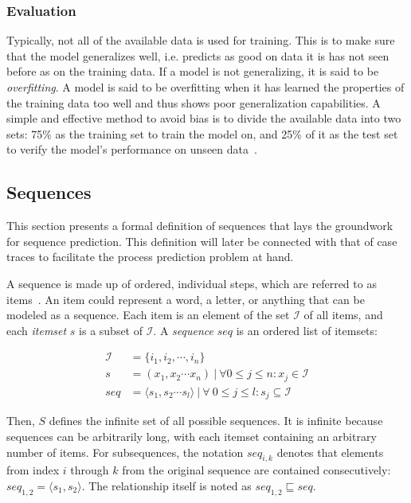 \subsubsection*{Evaluation}
Typically, not all of the available data is used for training. This is to make sure that the model generalizes well, i.e. predicts as good on data it is has not seen before as on the training data. If a model is not generalizing, it is said to be \textit{overfitting}. A model is said to be overfitting when it has learned the properties of the training data too well and thus shows poor generalization capabilities. A simple and effective method to avoid bias is to divide the available data into two sets: 75\% as the training set to train the model on, and 25\% of it as the test set to verify the model's performance on unseen data~\cite{kuhn2013applied, lessmannBADS}.

\subsection{Sequences}\label{sec:background:sequences}
This section presents a formal definition of sequences that lays the groundwork for sequence prediction. This definition will later be connected with that of case traces to facilitate the process prediction problem at hand.

A sequence is made up of ordered, individual steps, which are referred to as items~\cite{han2000freespan}. An item could represent a word, a letter, or anything that can be modeled as a sequence. Each item is an element of the set $\mathscr{I}$ of all items, and each \textit{itemset} $s$ is a subset of $\mathscr{I}$. A \textit{sequence} $seq$ is an ordered list of itemsets:

\begin{equation*}
\begin{split}
\mathscr{I} &= \{i_1, i_2, \cdots, i_n\}\\
        s   &= (x_1,x_2\cdots x_n)\ |\ \forall 0 \leq j \leq n: x_j \in \mathscr{I}\\
        seq &= \langle s_1,s_2\cdots s_l \rangle\ |\ \forall\ 0 \leq j \leq l: s_j \subseteq \mathscr{I}
\end{split}
\end{equation*}

Then, $S$ defines the infinite set of all possible sequences. It is infinite because sequences can be arbitrarily long, with each itemset containing an arbitrary number of items. For  subsequences, the notation $seq_{i,k}$ denotes that elements from index $i$ through $k$ from the original sequence are contained consecutively: $seq_{1,2} = \langle s_1,s_2 \rangle$. The relationship itself is noted as $seq_{1,2} \sqsubseteq seq$.\\

